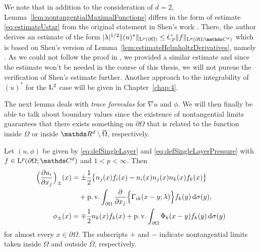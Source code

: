 \begin{rem}
  We note that in addition to the consideration of $d = 2$, Lemma~\ref{lem:nontangentialMaximalFunctions} differs in the form of estimate \eqref{eq:estimateUstar} from the original statement in Shen's work \cite[Lem.\@~3.2]{Shen2012}.
  There, the author derives an estimate of the form $|\lambda|^{1/2}\|(u)^*\|_{\Ell^p(\partial\Omega)} \leq C_p \|f\|_{\Ell^p(\partial\Omega; \C^d)}$ which is based on Shen's version of Lemma~\ref{lem:estimateHelmholtzDerivatives}, namely \cite[Lem.\@~2.1]{Shen2012}.
  As we could not follow the proof in \cite{Shen2012}, we provided a similar estimate and since the estimate won't be needed in the course of this thesis, we will not pursue the verification of Shen's estimate further.
  Another approach to the integrability of $(u)^*$ for the $\mathrm{L}^2$ case will be given in Chapter~\ref{chap:4}.
\end{rem}

The next lemma deals with \emph{trace formulas} for $\nabla u$ and $\phi$. 
We will then finally be able to talk about boundary values since the existence of nontangential limits guarantees that there exists something on $\partial\Omega$ that is related to the function inside $\Omega$ or inside $\R^d \setminus \overline\Omega$, respectively.

\begin{lem}
  \label{lem:traceFormulas}
  Let $(u,\phi)$ be given by \eqref{eq:defSingleLayer} and \eqref{eq:defSingleLayerPressure} with $f \in \Ell^p(\partial\Omega; \C^d)$ and $1 < p < \infty$.
  Then
  \begin{align}
    \Big( \frac{\partial u_i}{\partial x_j} \Big)_{\pm}(x) 
    &= \pm \frac{1}{2} \big\{ n_j(x) f_i(x) - n_i(x) n_j(x) n_k(x) f_k(x) \big\} \nonumber\\
    &\quad+ \operatorname{p. v.} \int_{\partial\Omega} \frac{\partial}{\partial x_j} \Big\{ \Gamma_{ik} (x - y; \lambda) \Big\} f_k(y) \, {\operatorname{d}\!{\sigma}}(y), \label{eq:traceFormula} \\
    \phi_\pm(x) &= \mp \frac{1}{2} n_k(x) f_k(x) + \operatorname{p. v.}\int_{\partial\Omega} \Phi_k(x - y) f_k(y) \, {\operatorname{d}\!{\sigma}}(y) \nonumber
  \end{align}
  for almost every $x \in \partial\Omega$.
  The subscripts $+$ and $-$ indicate nontangential limits taken inside $\Omega$ and outside $\overline\Omega$, respectively.
\end{lem}

